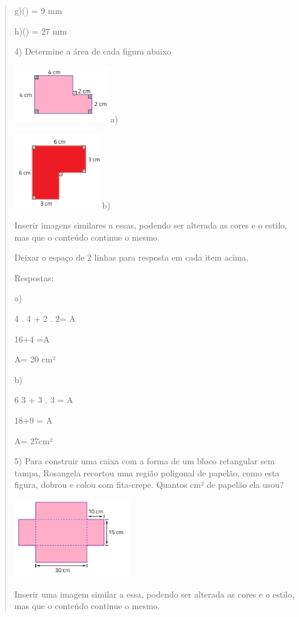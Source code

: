 \begin{quote}
\begin{escolha}
g)() = 9 mm

h)() = 27 mm

4) Determine a área de cada figura abaixo

\includegraphics[width=1.65in,height=0.96458in]{./imgSAEB_8_MAT/media/image43.png}a)

\includegraphics[width=1.50833in,height=1.28681in]{./imgSAEB_8_MAT/media/image44.png}b)

Inserir imagens similares a essas, podendo ser alterada as cores e o
estilo, mas que o conteúdo continue o mesmo.

Deixar o espaço de 2 linhas para resposta em cada item acima.

Respostas:

a)

4 . 4 + 2 . 2= A

16+4 =A

A= 20 cm²

b)

\num{6} 3 + 3 . 3 = A

18+9 = A

A= 27cm²

5) Para construir uma caixa com a forma de um bloco retangular sem
tampa, Rosangela recortou uma região poligonal de papelão, como esta
figura, dobrou e colou com fita-crepe. Quantos cm² de papelão ela usou?

\includegraphics[width=1.98333in,height=1.33255in]{./imgSAEB_8_MAT/media/image45.png}

Inserir uma imagem similar a essa, podendo ser alterada as cores e o
estilo, mas que o conteúdo continue o mesmo.


\end{escolha}
\end{quote}
